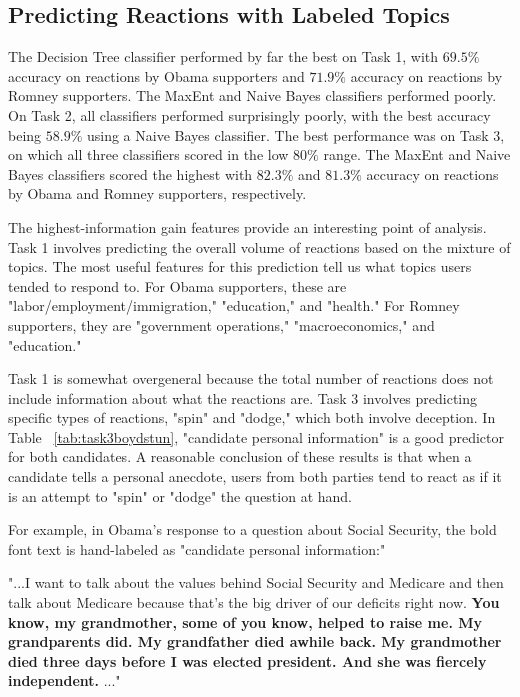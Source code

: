 \documentclass[12pt]{article}
\begin{document}
\subsection{Predicting Reactions with Labeled Topics}

The Decision Tree classifier performed by far the best on Task 1, with $69.5\%$  accuracy on reactions by Obama supporters and $71.9\%$ accuracy on reactions by Romney supporters. The MaxEnt and Naive Bayes classifiers performed poorly. On Task 2, all classifiers performed surprisingly poorly, with the best accuracy being $58.9\%$ using a Naive Bayes classifier. The best performance was on Task 3, on which all three classifiers scored in the low $80\%$ range. The MaxEnt and Naive Bayes classifiers scored the highest with $82.3\%$ and $81.3\%$ accuracy on reactions by Obama and Romney supporters, respectively.


The highest-information gain features provide an interesting point of analysis. Task 1 involves predicting the overall volume of reactions based on the mixture of topics. The most useful features for this prediction tell us what topics users tended to respond to. For Obama supporters, these are "labor/employment/immigration," "education," and "health." For Romney supporters, they are "government operations," "macroeconomics," and "education."

Task 1 is somewhat overgeneral because the total number of reactions does not include information about what the reactions are. Task 3 involves predicting specific types of reactions, "spin" and "dodge," which both involve deception. In Table ~\ref{tab:task3boydstun}, "candidate personal information" is a good predictor for both candidates. A reasonable conclusion of these results is that when a candidate tells a personal anecdote, users from both parties tend to react as if it is an attempt to "spin" or "dodge" the question at hand.

For example, in Obama's response to a question about Social Security, the bold font text is hand-labeled as "candidate personal information:"

\footnotesize
\vspace*{.2in}
"...I want to talk about the values behind Social Security and Medicare and then talk about Medicare because that's the big driver of our deficits right now. \textbf{You know, my grandmother, some of you know, helped to raise me. My grandparents did. My grandfather died awhile back. My grandmother died three days before I was elected president. And she was fiercely independent.} ..."
\vspace*{.2in}
\normalsize
\end{document}
